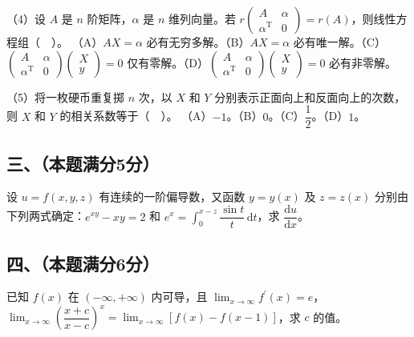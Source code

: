 \documentclass[UTF8,12pt]{ctexart}
\begin{document}
（4）设 \(\displaystyle A\) 是 \(\displaystyle n\) 阶矩阵，\(\displaystyle \alpha\) 是 \(\displaystyle n\) 维列向量。若 \(\displaystyle r\!\begin{pmatrix}A&\alpha\\\alpha^{\mathrm T}&0\end{pmatrix}=r(A)\)，则线性方程组（　）。
（A）\(\displaystyle AX=\alpha\) 必有无穷多解。（B）\(\displaystyle AX=\alpha\) 必有唯一解。（C）\(\displaystyle \begin{pmatrix}A&\alpha\\\alpha^{\mathrm T}&0\end{pmatrix}\begin{pmatrix}X\\y\end{pmatrix}=0\) 仅有零解。（D）\(\displaystyle \begin{pmatrix}A&\alpha\\\alpha^{\mathrm T}&0\end{pmatrix}\begin{pmatrix}X\\y\end{pmatrix}=0\) 必有非零解。


（5）将一枚硬币重复掷 \(\displaystyle n\) 次，以 \(\displaystyle X\) 和 \(\displaystyle Y\) 分别表示正面向上和反面向上的次数，则 \(\displaystyle X\) 和 \(\displaystyle Y\) 的相关系数等于（　）。
（A）\(\displaystyle -1\)。（B）\(\displaystyle 0\)。（C）\(\displaystyle \dfrac{\displaystyle 1}{\displaystyle 2}\)。（D）\(\displaystyle 1\)。


\subsection*{三、（本题满分5分）}

设 \(\displaystyle u=f(x,\allowbreak y,\allowbreak z)\) 有连续的一阶偏导数，又函数 \(\displaystyle y=y(x)\) 及 \(\displaystyle z=z(x)\) 分别由下列两式确定：\(\displaystyle e^{xy}-xy=2\) 和 \(\displaystyle e^x=\displaystyle \int_0^{x-z}\dfrac{\displaystyle \sin t}{\displaystyle t}\,\mathrm dt\)，求 \(\displaystyle \dfrac{\displaystyle \mathrm du}{\displaystyle \mathrm dx}\)。


\subsection*{四、（本题满分6分）}

已知 \(\displaystyle f(x)\) 在 \(\displaystyle (-\infty,\allowbreak +\infty)\) 内可导，且 \(\displaystyle \lim_{x\to\infty}f^{\prime}(x)=e\)，\(\displaystyle \lim_{x\to\infty}\left(\dfrac{\displaystyle x+c}{\displaystyle x-c}\right)^x=\displaystyle \lim_{x\to\infty}[f(x)-f(x-1)]\)，求 \(\displaystyle c\) 的值。
\end{document}
